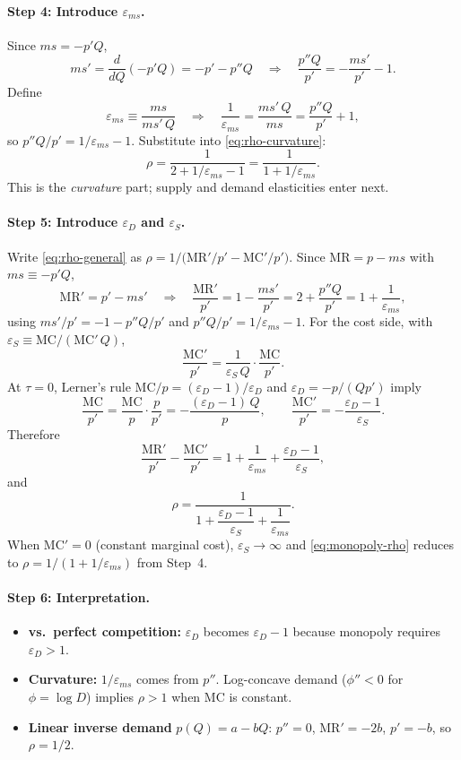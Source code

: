 \documentclass[11pt]{article}
\begin{document}
\paragraph{Step 4: Introduce $\varepsilon_{ms}$.}
Since $ms = -p'Q$,
\[
  ms' = \frac{d}{dQ}(-p'Q) = -p' - p''Q
  \quad\Rightarrow\quad
  \frac{p''Q}{p'} = -\frac{ms'}{p'} - 1.
\]
Define
\[
  \varepsilon_{ms} \equiv \frac{ms}{ms'\,Q}
  \quad\Rightarrow\quad
  \frac{1}{\varepsilon_{ms}} = \frac{ms'\,Q}{ms}
  = \frac{p''Q}{p'} + 1,
\]
so $p''Q/p' = 1/\varepsilon_{ms} - 1$.  Substitute into
\eqref{eq:rho-curvature}:
\[
  \rho = \frac{1}{2 + 1/\varepsilon_{ms} - 1}
  = \frac{1}{1 + 1/\varepsilon_{ms}}.
\]
This is the \emph{curvature} part; supply and demand elasticities enter next.

\paragraph{Step 5: Introduce $\varepsilon_D$ and $\varepsilon_S$.}
Write \eqref{eq:rho-general} as
$\rho = 1/\bigl(\mathrm{MR}'/p' - \mathrm{MC}'/p'\bigr)$.
Since $\mathrm{MR} = p - ms$ with $ms \equiv -p'Q$,
\[
  \mathrm{MR}' = p' - ms'
  \quad\Rightarrow\quad
  \frac{\mathrm{MR}'}{p'}
  = 1 - \frac{ms'}{p'}
  = 2 + \frac{p''Q}{p'}
  = 1 + \frac{1}{\varepsilon_{ms}},
\]
using $ms'/p' = -1 - p''Q/p'$ and $p''Q/p' = 1/\varepsilon_{ms} - 1$.
For the cost side, with $\varepsilon_S \equiv \mathrm{MC}/(\mathrm{MC}'\,Q)$,
\[
  \frac{\mathrm{MC}'}{p'}
  = \frac{1}{\varepsilon_S\,Q}\cdot\frac{\mathrm{MC}}{p'}.
\]
At $\tau = 0$, Lerner's rule $\mathrm{MC}/p = (\varepsilon_D-1)/\varepsilon_D$ and
$\varepsilon_D = -p/(Q p')$ imply
\[
  \frac{\mathrm{MC}}{p'}
  = \frac{\mathrm{MC}}{p}\cdot\frac{p}{p'}
  = -\frac{(\varepsilon_D - 1)\,Q}{p},
  \qquad
  \frac{\mathrm{MC}'}{p'} = -\frac{\varepsilon_D - 1}{\varepsilon_S}.
\]
Therefore
\[
  \frac{\mathrm{MR}'}{p'} - \frac{\mathrm{MC}'}{p'}
  = 1 + \frac{1}{\varepsilon_{ms}} + \frac{\varepsilon_D - 1}{\varepsilon_S},
\]
and
\begin{equation}
  \rho = \frac{1}{1 + \dfrac{\varepsilon_D - 1}{\varepsilon_S}
    + \dfrac{1}{\varepsilon_{ms}}}.
  \label{eq:monopoly-rho}
\end{equation}
When $\mathrm{MC}' = 0$ (constant marginal cost), $\varepsilon_S \to \infty$ and
\eqref{eq:monopoly-rho} reduces to $\rho = 1/(1 + 1/\varepsilon_{ms})$ from
Step~4.

\paragraph{Step 6: Interpretation.}
\begin{itemize}
  \item \textbf{vs.\ perfect competition:} $\varepsilon_D$ becomes
    $\varepsilon_D - 1$ because monopoly requires $\varepsilon_D > 1$.
  \item \textbf{Curvature:} $1/\varepsilon_{ms}$ comes from $p''$.
    Log-concave demand ($\phi'' < 0$ for $\phi = \log D$) implies
    $\rho > 1$ when $\mathrm{MC}$ is constant.
  \item \textbf{Linear inverse demand} $p(Q) = a - bQ$: $p'' = 0$,
    $\mathrm{MR}' = -2b$, $p' = -b$, so $\rho = 1/2$.
\end{itemize}
\end{document}
